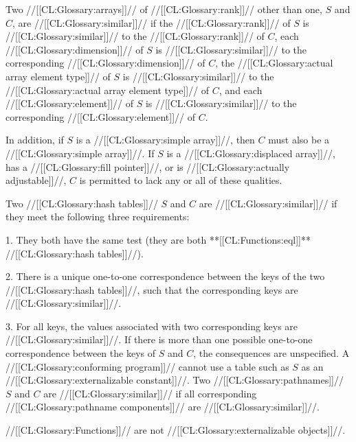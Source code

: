 Two //[[CL:Glossary:arrays]]// of //[[CL:Glossary:rank]]// other than one, $S$ and $C$, are //[[CL:Glossary:similar]]// if
     the //[[CL:Glossary:rank]]// of $S$ is //[[CL:Glossary:similar]]// to the //[[CL:Glossary:rank]]// of $C$,
     each //[[CL:Glossary:dimension]]// of $S$ is //[[CL:Glossary:similar]]// to 
      the corresponding //[[CL:Glossary:dimension]]// of $C$,
     the //[[CL:Glossary:actual array element type]]// of $S$ is //[[CL:Glossary:similar]]// to
     the //[[CL:Glossary:actual array element type]]// of $C$,
 and each //[[CL:Glossary:element]]// of $S$ is //[[CL:Glossary:similar]]// to
      the corresponding //[[CL:Glossary:element]]// of $C$.

In addition, if $S$ is a //[[CL:Glossary:simple array]]//, then $C$ must also be a //[[CL:Glossary:simple array]]//. If $S$ is a //[[CL:Glossary:displaced array]]//,
       has a //[[CL:Glossary:fill pointer]]//,
    or is //[[CL:Glossary:actually adjustable]]//,  $C$ is permitted to lack any or all of these qualities.


Two //[[CL:Glossary:hash tables]]// $S$ and $C$ are //[[CL:Glossary:similar]]// if they meet the following three requirements:
  \beginlist \item{1.}  They both have the same test 
 	    (\eg they are both **[[CL:Functions:eql]]** //[[CL:Glossary:hash tables]]//).
  \item{2.}  There is a unique one-to-one correspondence between the keys of
           the two //[[CL:Glossary:hash tables]]//, such that the corresponding keys are  	   //[[CL:Glossary:similar]]//.

\item{3.}  For all keys, the values associated with two corresponding keys
           are //[[CL:Glossary:similar]]//. \endlist
  If there is more than one possible one-to-one correspondence between the keys of $S$ and $C$, the consequences are unspecified.   A //[[CL:Glossary:conforming program]]// cannot use a table such as $S$ as an //[[CL:Glossary:externalizable constant]]//.
  Two //[[CL:Glossary:pathnames]]// $S$ and $C$ are //[[CL:Glossary:similar]]// if all corresponding  //[[CL:Glossary:pathname components]]// are //[[CL:Glossary:similar]]//.

   //[[CL:Glossary:Functions]]// are not //[[CL:Glossary:externalizable objects]]//.

